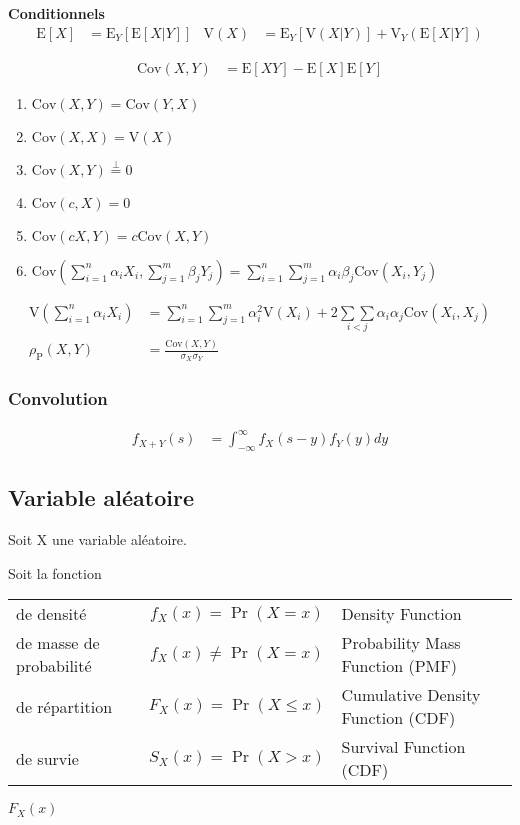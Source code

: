 \documentclass[10pt, french]{article}
\begin{document}
\begin{multicols*}{2}
\textbf{Conditionnels}
\begin{align*}
	\text{E}[X]	&=	\text{E}_{Y}[\text{E}[X|Y]]	&
	\text{V}(X)	&=	\text{E}_{Y}[\text{V}(X|Y)] + \text{V}_{Y}(\text{E}[X|Y])
\end{align*}

\begin{align*}
	\text{Cov}(X, Y)	
		&=	\text{E}[XY] - \text{E}[X] \text{E}[Y]	
\end{align*}

\begin{enumerate}
	\item $\text{Cov}(X, Y) = \text{Cov}(Y, X)$
	\item $\text{Cov}(X, X) = \text{V}(X)$
	\item $\text{Cov}(X, Y) \overset{\bot}{=} 0$
	\item $\text{Cov}(c, X) = 0$
	\item $\text{Cov}(cX, Y) = c\text{Cov}(X, Y)$
	\item $\text{Cov}(\sum_{i = 1}^{n}\alpha_{i} X_{i}, \sum_{j = 1}^{m}\beta_{j} Y_{j}) = \sum_{i = 1}^{n}\sum_{j = 1}^{m}\alpha_{i}\beta_{j}  \text{Cov}(X_{i}, Y_{j})$
\end{enumerate}

\begin{align*}
	\text{V}(\sum_{i = 1}^{n}\alpha_{i} X_{i}) 
		&= \sum_{i = 1}^{n}\sum_{j = 1}^{m}\alpha_{i}^{2}\text{V}(X_{i}) + 2 \underset{i < j}{\sum\sum} \alpha_{i}\alpha_{j} \text{Cov}(X_{i}, X_{j})	\\
	\rho_{\textrm{P}}(X, Y)
		&=	\frac{\text{Cov}(X, Y)}{\sigma_{X}\sigma_{Y}}
\end{align*}

\subsubsection*{Convolution}
\begin{align*}
	f_{X + Y}(s)	
		&=	\int_{-\infty}^{\infty} f_{X}(s - y) f_{Y}(y) dy	
\end{align*}

\subsection*{Variable aléatoire}

Soit X une variable aléatoire.

Soit la fonction

\begin{tabular}{| l | c | l |}
\hline
	de densité	&	$f_{X}(x) = \Pr(X = x)$	&	 Density Function	\\
	de masse de probabilité	&	$f_{X}(x) \neq \Pr(X = x)$	&	Probability Mass Function (PMF)	\\
	de répartition	&	$F_{X}(x) = \Pr(X \le x)$	&	Cumulative Density Function (CDF)\\
	de survie	&	$S_{X}(x) = \Pr(X > x)$	&	Survival Function (CDF)\\\hline	
\end{tabular}
$F_{X}(x)$


\end{multicols*}
\end{document}
